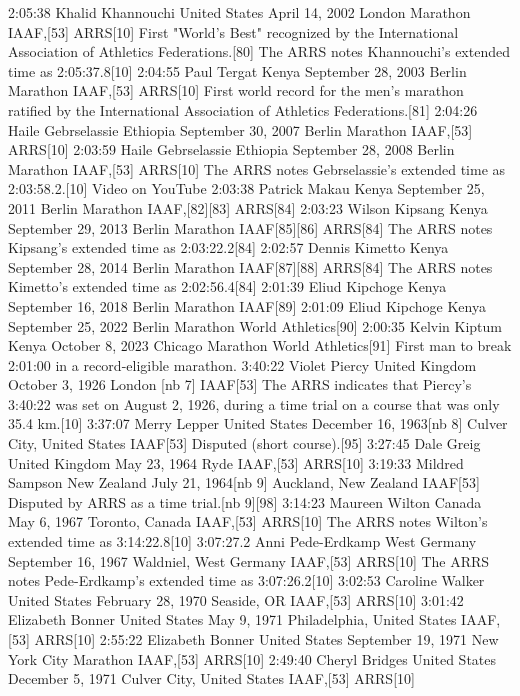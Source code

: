 2:05:38	Khalid Khannouchi	 United States	April 14, 2002	London Marathon	IAAF,[53] ARRS[10]	First "World's Best" recognized by the International Association of Athletics Federations.[80] The ARRS notes Khannouchi's extended time as 2:05:37.8[10]
2:04:55	Paul Tergat	 Kenya	September 28, 2003	Berlin Marathon	IAAF,[53] ARRS[10]	First world record for the men's marathon ratified by the International Association of Athletics Federations.[81]
2:04:26	Haile Gebrselassie	 Ethiopia	September 30, 2007	Berlin Marathon	IAAF,[53] ARRS[10]	
2:03:59	Haile Gebrselassie	 Ethiopia	September 28, 2008	Berlin Marathon	IAAF,[53] ARRS[10]	The ARRS notes Gebrselassie's extended time as 2:03:58.2.[10] Video on YouTube
2:03:38	Patrick Makau	 Kenya	September 25, 2011	Berlin Marathon	IAAF,[82][83] ARRS[84]	
2:03:23	Wilson Kipsang	 Kenya	September 29, 2013	Berlin Marathon	IAAF[85][86] ARRS[84]	The ARRS notes Kipsang's extended time as 2:03:22.2[84]
2:02:57	Dennis Kimetto	 Kenya	September 28, 2014	Berlin Marathon	IAAF[87][88] ARRS[84]	The ARRS notes Kimetto's extended time as 2:02:56.4[84]
2:01:39	Eliud Kipchoge	 Kenya	September 16, 2018	Berlin Marathon	IAAF[89]	
2:01:09	Eliud Kipchoge	 Kenya	September 25, 2022	Berlin Marathon	World Athletics[90]	
2:00:35	Kelvin Kiptum	 Kenya	October 8, 2023	Chicago Marathon	World Athletics[91]	First man to break 2:01:00 in a record-eligible marathon.
3:40:22	Violet Piercy	 United Kingdom	October 3, 1926	London [nb 7]	IAAF[53]	The ARRS indicates that Piercy's 3:40:22 was set on August 2, 1926, during a time trial on a course that was only 35.4 km.[10]
3:37:07	Merry Lepper	 United States	December 16, 1963[nb 8]	Culver City, United States	IAAF[53]	Disputed (short course).[95]
3:27:45	Dale Greig	 United Kingdom	May 23, 1964	Ryde	IAAF,[53] ARRS[10]	
3:19:33	Mildred Sampson	 New Zealand	July 21, 1964[nb 9]	Auckland, New Zealand	IAAF[53]	Disputed by ARRS as a time trial.[nb 9][98]
3:14:23	Maureen Wilton	 Canada	May 6, 1967	Toronto, Canada	IAAF,[53] ARRS[10]	The ARRS notes Wilton's extended time as 3:14:22.8[10]
3:07:27.2	Anni Pede-Erdkamp	 West Germany	September 16, 1967	Waldniel, West Germany	IAAF,[53] ARRS[10]	The ARRS notes Pede-Erdkamp's extended time as 3:07:26.2[10]
3:02:53	Caroline Walker	 United States	February 28, 1970	Seaside, OR	IAAF,[53] ARRS[10]	
3:01:42	Elizabeth Bonner	 United States	May 9, 1971	Philadelphia, United States	IAAF,[53] ARRS[10]	
2:55:22	Elizabeth Bonner	 United States	September 19, 1971	New York City Marathon	IAAF,[53] ARRS[10]	
2:49:40	Cheryl Bridges	 United States	December 5, 1971	Culver City, United States	IAAF,[53] ARRS[10]	
